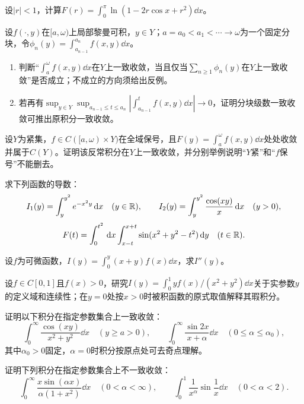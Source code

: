 设$|r|<1$，计算$F(r)=\int_0^\pi\ln(1-2r\cos x+r^2)\dd x$。

设$f(\cdot,y)$在$[a,\omega)$上局部黎曼可积，$y\in Y$；$a=a_0<a_1<\cdots\to\omega$为一个固定分块，令$\phi_n(y)=\int_{a_{n-1}}^{a_n}f(x,y)\dd x$。
\begin{enumerate}[label=(\arabic*)]
\item 判断“$\int_a^\omega f(x,y)\dd x$在$Y$上一致收敛，当且仅当$\sum_{n\ge1}\phi_n(y)$在$Y$上一致收敛”是否成立；不成立的方向须给出反例。
\item 若再有$\sup_{y\in Y}\sup_{a_{n-1}\le t\le a_n}|\int_{a_{n-1}}^t f(x,y)\dd x|\to0$，证明分块级数一致收敛可推出原积分一致收敛。
\end{enumerate}

设$Y$为紧集，$f\in C([a,\omega)\times Y)$在全域保号，且$F(y)=\int_a^\omega f(x,y)\dd x$处处收敛并属于$C(Y)$。证明该反常积分在$Y$上一致收敛，并分别举例说明“$Y$紧”和“$f$保号”不能删去。

求下列函数的导数：
\[
 I_1(y)=\int_y^{y^2}e^{-x^2y}\,\mathrm d x\quad(y\in\mathbb R),\qquad
 I_2(y)=\int_y^{y^2}\frac{\cos(xy)}x\,\mathrm d x\quad(y>0),
\]
\[
 F(t)=\int_0^{t^2}\,\mathrm d x\int_{x-t}^{x+t}\sin(x^2+y^2-t^2)\,\mathrm d y\quad(t\in\mathbb R).
\]

设$f$为可微函数，$I(y)=\int_0^y(x+y)f(x)\dd x$，求$I''(y)$。

设$f\in C[0,1]$且$f(x)>0$，研究$I(y)=\int_0^1 yf(x)/(x^2+y^2)\dd x$关于实参数$y$的定义域和连续性；在$y=0$处按$x>0$时被积函数的原式取值解释其瑕积分。

证明以下积分在指定参数集合上一致收敛：
\[
 \int_0^\infty\frac{\cos(xy)}{x^2+y^2}\dd x\quad(y\ge a>0),
 \qquad
 \int_0^\infty\frac{\sin2x}{x+\alpha}\dd x\quad(0\le\alpha\le\alpha_0),
\]
其中$\alpha_0>0$固定，$\alpha=0$时积分按原点处可去奇点理解。

证明下列积分在指定参数集合上不一致收敛：
\[
 \int_0^\infty\frac{x\sin(\alpha x)}{\alpha(1+x^2)}\dd x
 \quad(0<\alpha<\infty),\qquad
 \int_0^1\frac1{x^\alpha}\sin\frac1x\dd x\quad(0<\alpha<2).
\]

